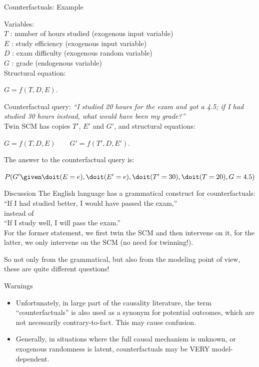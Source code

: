 \begin{frame}{Counterfactuals: Example}
  \begin{example}
  Variables:\\
    \quad $T$ : number of hours studied (exogenous input variable)\\
    \quad $E$ : study efficiency (exogenous input variable)\\
    \quad $D$ : exam difficulty (exogenous random variable)\\
    \quad $G$ : grade (endogenous variable)\\
  Structural equation:\\
  \smallskip
  \centerline{$G = f(T,D,E).$}
  \smallskip
  Counterfactual query: {\it ``I studied 20 hours for the exam and
got a 4.5; if I had studied 30 hours instead, what would have been my grade?''}\\

    \medskip
    Twin SCM has copies $T'$, $E'$ and $G'$, and structural equations:\\
    \smallskip
    \centerline{$G = f(T,D,E) \qquad G' = f(T',D,E').$}
    \smallskip
    The answer to the counterfactual query is:\\
    \smallskip
    \centerline{$P(G' \given \doit(E=e), \doit(E'=e), \doit(T'=30), \doit(T=20), G=4.5)$}
    \smallskip
  \end{example}
\end{frame}

\begin{frame}{Discussion}
The English language has a grammatical construct for counterfactuals:\\
\quad ``If I had studied better, I would have passed the exam,''\\
instead of\\
\quad ``If I study well, I will pass the exam.''\\
For the former statement, we first twin the SCM and then intervene on it, for the latter, we only intervene on the SCM (no need for twinning!). 

\bigskip
So not only from the grammatical, but also from the modeling point of view, these are quite different questions!

\bigskip
{}
  \begin{block}{Warnings}
    \begin{itemize}
      \item
  Unfortunately, in large part of the causality literature, the term ``counterfactuals'' is also used 
  as a synonym for potential outcomes, which are not necessarily contrary-to-fact. This may
  cause confusion.
\item Generally, in situations where the full causal mechanism is unknown, or exogenous
randomness is latent, counterfactuals may be VERY model-dependent.
    \end{itemize}
  \end{block}
\end{frame}



